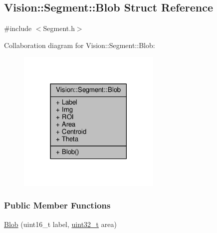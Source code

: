 \hypertarget{struct_vision_1_1_segment_1_1_blob}{}\subsection{Vision\+:\+:Segment\+:\+:Blob Struct Reference}
\label{struct_vision_1_1_segment_1_1_blob}


{\ttfamily \#include $<$Segment.\+h$>$}



Collaboration diagram for Vision\+:\+:Segment\+:\+:Blob\+:
\nopagebreak
\begin{figure}[H]
\begin{center}
\leavevmode
\includegraphics[width=194pt]{struct_vision_1_1_segment_1_1_blob__coll__graph}
\end{center}
\end{figure}
\subsubsection*{Public Member Functions}
\begin{DoxyCompactItemize}
\item 
\hyperlink{struct_vision_1_1_segment_1_1_blob_a4133b605534057e3747506d03e4041cb}{Blob} (uint16\+\_\+t label, \hyperlink{_soil_math_types_8h_a435d1572bf3f880d55459d9805097f62}{uint32\+\_\+t} area)
\end{DoxyCompactItemize}
